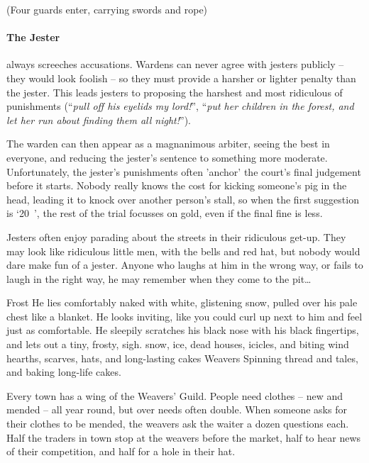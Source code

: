 \begin{multicols}{2}
\begin{dlist}
  (Four guards enter, carrying swords and rope)
\end{dlist}

\paragraph{The Jester}
always screeches accusations.
Wardens can never agree with jesters publicly -- they would look foolish -- so they must provide a harsher or lighter penalty than the jester.
This leads jesters to proposing the harshest and most ridiculous of punishments (``\emph{pull off his eyelids my lord!}'', ``\emph{put her children in the forest, and let her run about finding them all night!}'').

The warden can then appear as a magnanimous arbiter, seeing the best in everyone, and reducing the jester's sentence to something more moderate.
Unfortunately, the jester's punishments often 'anchor' the court's final judgement before it starts.
Nobody really knows the cost for kicking someone's pig in the head, leading it to knock over another person's stall, so when the first suggestion is `20~', the rest of the trial focusses on gold, even if the final fine is less.


Jesters often enjoy parading about the streets in their ridiculous get-up.
They may look like ridiculous little men, with the bells and red hat, but nobody would dare make fun of a jester.
Anyone who laughs at him in the wrong way, or fails to laugh in the right way, he may remember when they come to the pit\ldots

  {Frost}%
  {
    He lies comfortably naked with white, glistening snow, pulled over his pale chest like a blanket.
    He looks inviting, like you could curl up next to him and feel just as comfortable.
    He sleepily scratches his black nose with his black fingertips, and lets out a tiny, frosty, sigh.
  }%
  {snow, ice, dead houses, icicles, and biting wind}%
  {hearths, scarves, hats, and long-lasting cakes}%
  {Weavers}%
  {
    Spinning thread and tales, and baking long-life cakes.
  }%

Every town has a wing of the Weavers' Guild.
People need clothes -- new and mended -- all year round, but over needs often double.
When someone asks for their clothes to be mended, the weavers ask the waiter a dozen questions each.
Half the traders in town stop at the weavers before the market, half to hear news of their competition, and half for a hole in their hat.


\end{multicols}
